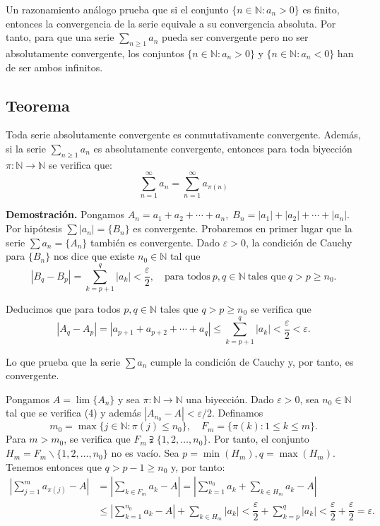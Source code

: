 \documentclass[10pt,a4paper]{article}
\begin{document}
	Un razonamiento análogo prueba que si el conjunto $\{n \in \mathbb{N}: a_n > 0\}$ es finito, entonces la convergencia de la serie equivale a su convergencia absoluta. Por tanto, para que una serie $\displaystyle \sum_{n \geq 1}a_n$ pueda ser convergente pero no ser absolutamente convergente, los conjuntos $\{n \in \mathbb{N}: a_n > 0\}$ y  $\{n \in \mathbb{N}: a_n < 0\}$ han de ser ambos infinitos.
	
	\subsection{Teorema}
	Toda serie absolutamente convergente es conmutativamente convergente. Además, si la serie $\displaystyle \sum_{n \geq 1}a_n$ es absolutamente convergente, entonces para toda biyección $\pi : \mathbb{N} \rightarrow \mathbb{N}$ se verifica que: 
	$$\displaystyle \sum_{n = 1}^\infty a_n = \displaystyle \sum_{n = 1} ^\infty a_{\pi(n)}$$
	
	\textbf{Demostración. }Pongamos $A_n = a_1 + a_2 + \cdots + a_n, \; B_n = |a_1| + |a_2| + \cdots + |a_n|$. Por hipótesis $\sum |a_n| = \{B_n\}$ es convergente. Probaremos en primer lugar que la serie $\sum a_n = \{A_n\}$ también es convergente. Dado $\varepsilon > 0$, la condición de Cauchy para $\{B_n\}$ nos dice que existe $n_0 \in \mathbb{N}$ tal que 
	\begin{equation}
		|B_q - B_p| = \sum_{k = p+1} ^q |a_k| < \dfrac{\varepsilon}{2}, \quad \text{para todos} ~ p, q \in \mathbb{N} ~ \text{tales que} ~ q > p \geq n_0.
	\end{equation}
	
	Deducimos que para todos $p, q \in \mathbb{N}$ tales que $ q > p \geq n_0$ se verifica que
	$$|A_q - A_p| = |a_{p+1} + a_{p+2} + \cdots + a_q| \leq \sum_{k = p+1}^q |a_k| < \dfrac{\varepsilon}{2} < \varepsilon.$$
	
	Lo que prueba que la serie $\sum a_n$ cumple la condición de Cauchy y, por tanto, es convergente.
	
	Pongamos $A = \lim\{A_n\}$ y sea $\pi : \mathbb{N} \rightarrow \mathbb{N}$ una biyección. Dado $\varepsilon >0$, sea $n_0 \in \mathbb{N}$ tal que se verifica (4) y además $|A_{n_0} - A| < \varepsilon/2$. Definamos
	$$m_0 = \max\{j \in\mathbb{N}: \pi(j) \leq n_0\}, \quad F_m = \{\pi(k): 1 \leq k \leq m\}.$$
	Para $m > m_0$, se verifica que $F_m \supsetneqq \{1, 2, \dots, n_0\}$. Por tanto, el conjunto $H_m = F_m \backslash \{1, 2, \dots, n_0\}$ no es vacío. Sea $p = \min(H_m), q = \max (H_m)$. Tenemos entonces que $q > p-1 \geq n_0$ y, por tanto:
	\begin{equation*}
		\begin{split}
			\left| \sum_{j = 1}^m a_{\pi(j)}-A \right| & = \left| \sum_{k \in F_m} a_k - A \right| = \left| \sum_{k = 1}^{n_0} a_k + \sum_{k \in H_m} a_k - A \right| \\
			& \leq \left|\sum_{k = 1} ^{n_0} a_k - A \right| + \sum_{k \in H_m} |a_k| < \dfrac{\varepsilon}{2} + \sum_{k = p} ^q |a_k| < \dfrac{\varepsilon}{2} + \dfrac{\varepsilon}{2} = \varepsilon.
		\end{split}
	\end{equation*}
\end{document}
